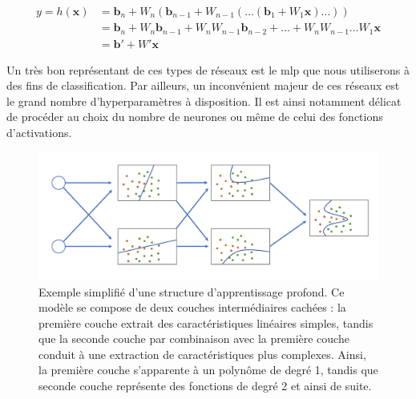 \begin{equation} 
    \label{eq:proof_linearity}
    \begin{split}
        y = h(\mathbf{x})   &=\mathbf{b}_n+W_n(\mathbf{b}_{n-1}+W_{n-1}(\dots (\mathbf{b}_1+W_1 \mathbf{x})\dots))\\
                            &=\mathbf{b}_n+W_n\mathbf{b}_{n-1}+W_nW_{n-1}\mathbf{b}_{n-2}+\dots+W_nW_{n-1}\dots W_1\mathbf{x}\\
                            &=\mathbf{b}'+W'\mathbf{x}
    \end{split}
\end{equation}
\par

Un très bon représentant de ces types de réseaux est le \gls{mlp} que nous utiliserons à des fins de classification. Par ailleurs, un inconvénient majeur de ces réseaux est le grand nombre d'hyperparamètres à disposition. Il est ainsi notamment délicat de procéder au choix du nombre de neurones ou même de celui des fonctions d'activations.\par

\addtocounter{footnote}{1}

\begin{figure}[H]
    \centering
    \includegraphics[width=\linewidth]{contents/chapter_3/resources/scheme_deep_understanding.pdf}
    \caption{Exemple simplifié d'une structure d’apprentissage profond. Ce modèle se compose de deux couches intermédiaires cachées : la première couche extrait des caractéristiques linéaires simples, tandis que la seconde couche par combinaison avec la première couche conduit à une extraction de caractéristiques plus complexes. Ainsi, la première couche s'apparente à un polynôme de degré 1, tandis que seconde couche représente des fonctions de degré 2 et ainsi de suite.}
    \label{fig:scheme_deep_understanding}
\end{figure}

